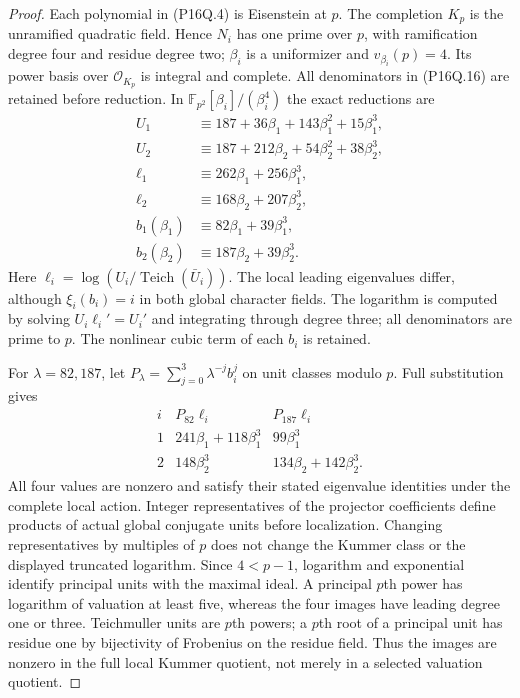 \begin{proof}
Each polynomial in (P16Q.4) is Eisenstein at $p$.
The completion $K_p$ is the unramified quadratic field.
Hence $N_i$ has one prime over $p$, with ramification degree
four and residue degree two; $\beta_i$ is a uniformizer and
$v_{\beta_i}(p)=4$.
Its power basis over $\mathcal O_{K_p}$ is integral and complete.
All denominators in (P16Q.16) are retained before reduction.
In $\mathbb F_{p^2}[\beta_i]/(\beta_i^4)$ the exact reductions are
\[
 \begin{aligned}
 U_1&\equiv187+36\beta_1+143\beta_1^2+15\beta_1^3,\\
 U_2&\equiv187+212\beta_2+54\beta_2^2+38\beta_2^3,\\
 \ell_1&\equiv262\beta_1+256\beta_1^3,\\
 \ell_2&\equiv168\beta_2+207\beta_2^3,\\
 b_1(\beta_1)&\equiv82\beta_1+39\beta_1^3,\\
 b_2(\beta_2)&\equiv187\beta_2+39\beta_2^3.
 \end{aligned}
 \tag{P16Q.18}
\]
Here $\ell_i=\log(U_i/\operatorname{Teich}(\bar U_i))$.
The local leading eigenvalues differ, although
$\xi_i(b_i)=i$ in both global character fields.
The logarithm is computed by solving $U_i\ell_i'=U_i'$ and
integrating through degree three; all denominators are prime
to $p$.  The nonlinear cubic term of each $b_i$ is retained.

For $\lambda=82,187$, let
$P_\lambda=\sum_{j=0}^3\lambda^{-j}b_i^j$ on unit classes modulo $p$.
Full substitution gives
\[
 \begin{array}{c|c|c}
 i&P_{82}\ell_i&P_{187}\ell_i\\ \hline
 1&241\beta_1+118\beta_1^3&99\beta_1^3\\
 2&148\beta_2^3&134\beta_2+142\beta_2^3.
 \end{array}
 \tag{P16Q.19}
\]
All four values are nonzero and satisfy their stated eigenvalue
identities under the complete local action.
Integer representatives of the projector coefficients define
products of actual global conjugate units before localization.
Changing representatives by multiples of $p$ does not change
the Kummer class or the displayed truncated logarithm.
Since $4<p-1$, logarithm and exponential identify principal
units with the maximal ideal.  A principal $p$th power has
logarithm of valuation at least five, whereas the four images
have leading degree one or three.
Teichmuller units are $p$th powers; a $p$th root of a principal
unit has residue one by bijectivity of Frobenius on the residue
field.  Thus the images are nonzero in the full local Kummer
quotient, not merely in a selected valuation quotient.


\end{proof}

